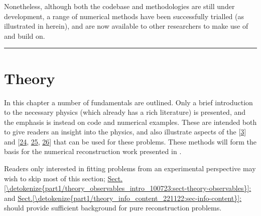 \documentclass[letterpaper,table,10pt,english]{jupyterBook}
\begin{document}
\sphinxAtStartPar
Nonetheless, although both the codebase and methodologies are still under development, a range of numerical methods have been successfully trialled (as illustrated in {\hyperref[\detokenize{part2/extracting_matrix_elements_overview_270423:chpt-extracting-matrix-elements-overview}]{}} herein), and are now available to other researchers to make use of and build on.


\bigskip\hrule\bigskip


\sphinxstepscope


\chapter{Theory}
\label{\detokenize{part1/theory_100723:theory}}\label{\detokenize{part1/theory_100723:chpt-theory}}\label{\detokenize{part1/theory_100723::doc}}
\sphinxAtStartPar
In this chapter a number of fundamentals are outlined. Only a brief introduction to the necessary physics (which already has a rich literature) is presented, and the emphasis is instead on code and numerical examples. These are intended both to give readers an insight into the physics, and also illustrate aspects of the  {[}\hyperlink{cite.backmatter/bibliography:id668}{3}{]} and  {[}\hyperlink{cite.backmatter/bibliography:id655}{24}, \hyperlink{cite.backmatter/bibliography:id597}{25}, \hyperlink{cite.backmatter/bibliography:id595}{26}{]} that can be used for these problems. These methods will form the basis for the numerical reconstruction work presented in {\hyperref[\detokenize{part2/extracting_matrix_elements_overview_270423:chpt-extracting-matrix-elements-overview}]{}}.

\sphinxAtStartPar
Readers only interested in fitting problems from an experimental perspective may wish to skip most of this section; \hyperref[\detokenize{part1/theory_observables_intro_100723:sect-theory-observables}]{Sect.\@ \ref{\detokenize{part1/theory_observables_intro_100723:sect-theory-observables}}:} and \hyperref[\detokenize{part1/theory_info_content_221122:sec-info-content}]{Sect.\@ \ref{\detokenize{part1/theory_info_content_221122:sec-info-content}}:} should provide sufficient background for pure reconstruction problems.

\sphinxstepscope
\end{document}
